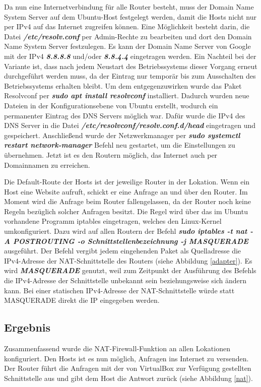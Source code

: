 \documentclass[fontsize=12pt,paper=a4,open=any,parskip=half,
  twoside=false,toc=listof,toc=bibliography,fleqn,leqno,
  captions=nooneline,captions=tableabove,british]{scrbook}
\begin{document}
Da nun eine Internetverbindung für alle Router besteht, muss der Domain Name System Server auf dem Ubuntu-Host festgelegt werden, damit die Hosts nicht nur per IPv4 auf das Internet zugreifen können. Eine Möglichkeit besteht darin, die Datei \textit{\textbf{/etc/resolv.conf}} per Admin-Rechte zu bearbeiten und dort den Domain Name System Server festzulegen. Es kann der Domain Name Server von Google mit der IPv4 \textit{\textbf{8.8.8.8}} und/oder \textit{\textbf{8.8.4.4}} eingetragen werden. Ein Nachteil bei der Variante ist, dass nach jedem Neustart des Betriebssystems dieser Vorgang erneut durchgeführt werden muss, da der Eintrag nur temporär bis zum Ausschalten des Betriebssystems erhalten bleibt. Um dem entgegenzuwirken wurde das Paket Resolvconf per \textit{\textbf{sudo apt install resolvconf}} installiert. Dadurch wurden neue Dateien in der Konfigurationsebene von Ubuntu erstellt, wodurch ein permanenter Eintrag des DNS Servers möglich war. Dafür wurde die IPv4 des DNS Server in die Datei \textit{\textbf{/etc/resolvconf/resolv.conf.d/head}} eingetragen und gespeichert. Anschließend wurde der Netzwerkmanager per \textit{\textbf{sudo systemctl restart network-manager}} Befehl neu gestartet, um die Einstellungen zu übernehmen. Jetzt ist es den Routern möglich, das Internet auch per Domainnamen zu erreichen.

Die Default-Route der Hosts ist der jeweilige Router in der Lokation. Wenn ein Host eine Website aufruft, schickt er eine Anfrage an und über den Router. Im Moment wird die Anfrage beim Router fallengelassen, da der Router noch keine Regeln bezüglich solcher Anfragen besitzt. Die Regel wird über das im Ubuntu vorhandene Programm iptables eingetragen, welches den Linux-Kernel umkonfiguriert. Dazu wird auf allen Routern der Befehl \textit{\textbf{sudo iptables -t nat -A POSTROUTING -o Schnittstellenbezeichnung -j MASQUERADE}} ausgeführt. Der Befehl vergibt jedem eingehenden Paket als Quelladresse die IPv4-Adresse der NAT-Schnittstelle des Routers (siehe Abbildung \ref{adapter}). Es wird \textit{\textbf{MASQUERADE}} genutzt, weil zum Zeitpunkt der Ausführung des Befehls die IPv4-Adresse der Schnittstelle unbekannt sein beziehungsweise sich ändern kann. Bei einer statischen IPv4-Adresse der NAT-Schnittstelle würde statt MASQUERADE direkt die IP eingegeben werden.

\subsection{Ergebnis}
Zusammenfassend wurde die NAT-Firewall-Funktion an allen Lokationen konfiguriert. Den Hosts ist es nun möglich, Anfragen ins Internet zu versenden. Der Router führt die Anfragen mit der von VirtualBox zur Verfügung gestellten Schnittstelle aus und gibt dem Host die Antwort zurück (siehe Abbildung \ref{nat}).
\end{document}
